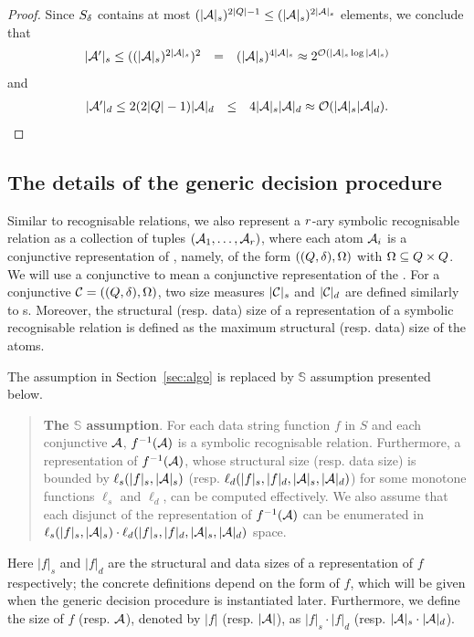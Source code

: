 \begin{proof}
Since $S_{\delta}$ contains at most $(|\mathcal{A}|_s)^{2 |Q|-1} \le (|\mathcal{A}|_s)^{2 |\mathcal{A}|_s}$ elements, we conclude that 
$$
\begin{array}{l c l}
|\mathcal{A}'|_s \le ((|\mathcal{A}|_s)^{2|\mathcal{A}|_s})^2  & = & (|\mathcal{A}|_s)^{4|\mathcal{A}|_s} 
 \approx    2^{\mathcal{O}\left(|\mathcal{A}|_s \log |\mathcal{A}|_s\right)}
\end{array}
$$ 
and 
$$
\begin{array}{l c l}
|\mathcal{A}'|_d \le 2(2|Q|-1) |\mathcal{A}|_d & \le & 4 |\mathcal{A}|_s |\mathcal{A}|_d 
\approx   \mathcal{O}( |\mathcal{A}|_s |\mathcal{A}|_d).
\end{array}
$$
\end{proof}




\subsection{The details of the generic decision procedure}


Similar to recognisable relations, we also represent a  $r$-ary symbolic recognisable relation as a collection of tuples $(\mathcal{A}_1, \ldots, \mathcal{A}_r)$, where each atom $\mathcal{A}_i$ is a conjunctive representation of \SA{}, namely, of the form $((Q, \delta), \Omega)$ with $\Omega \subseteq Q \times Q$. We will use a conjunctive \SA{} to mean a conjunctive representation of the \SA{}. For a conjunctive \SA{} $\mathcal{C}= ((Q, \delta), \Omega)$, two size measures $|\mathcal{C}|_s$ and $|\mathcal{C}|_d$ are defined similarly to \SA{}s. Moreover, the structural (resp. data) size of a representation of a symbolic recognisable relation is defined as the maximum structural (resp. data) size of the atoms.


The \prerec{} assumption in Section~\ref{sec:algo} is replaced by $\mathbb{S}$\prerec{} assumption presented below.
\begin{quote}
{\bf The $\mathbb{S}$\prerec{} assumption}. For each data string function $f$ in $S$ and each conjunctive \SA{} $\mathcal{A}$,  $f^{-1}(\mathcal{A})$ is a symbolic recognisable relation. Furthermore, 
a representation of $f^{-1}(\mathcal{A})$, whose structural size (resp. data size) is bounded by  $\ell_s(|f|_s, |\mathcal{A}|_s)$ (resp. $\ell_d(|f|_s,  |f|_d, |\mathcal{A}|_s, |\mathcal{A}|_d)$) for some monotone functions $\ell_s$ and $\ell_d$, can be computed effectively. We also assume that each disjunct of the representation of $f^{-1}(\mathcal{A})$ can be enumerated in $\ell_s(|f|_s, |\mathcal{A}|_s) \cdot \ell_d(|f|_s,  |f|_d, |\mathcal{A}|_s,  |\mathcal{A}|_d)$ space.
%
\end{quote} 
%
Here $|f|_s$ and $|f|_d$ are the structural and data sizes of a representation of $f$ respectively; the concrete definitions depend on the form of $f$, which will be given when the generic decision procedure is instantiated later. Furthermore, we define the size of $f$ (resp. $\mathcal{A}$), denoted by $|f|$ (resp. $|\mathcal{A}|$), as $|f|_s \cdot |f|_d$ (resp. $|\mathcal{A}|_s \cdot |\mathcal{A}|_d$).

